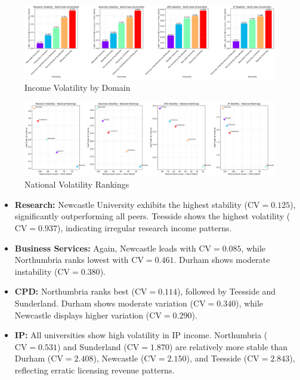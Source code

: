\documentclass[journal,onecolumn, 10pt,draftclsnofoot]{IEEEtran}
\begin{document}
\begin{figure}[h]
\centering
\includegraphics[width=0.99\textwidth]{Fig/figure41.ne_volatility_comparison.png}
\caption{Income Volatility by Domain}
\label{fig:ne-volatility-comparison}
\end{figure}

\begin{figure}[h]
\centering
\includegraphics[width=0.99\textwidth]{Fig/figure42.national_volatility_rankings.png}
\caption{National Volatility Rankings}
\label{fig:national-volatility-rankings}
\end{figure}

\begin{itemize}
    \item \textbf{Research:} Newcastle University exhibits the highest stability ($\mathrm{CV}=0.125$), significantly outperforming all peers. Teesside shows the highest volatility ($\mathrm{CV}=0.937$), indicating irregular research income patterns.
    
    \item \textbf{Business Services:} Again, Newcastle leads with $\mathrm{CV}=0.085$, while Northumbria ranks lowest with $\mathrm{CV}=0.461$. Durham shows moderate instability ($\mathrm{CV}=0.380$).
    
    \item \textbf{CPD:} Northumbria ranks best ($\mathrm{CV}=0.114$), followed by Teesside and Sunderland. Durham shows moderate variation ($\mathrm{CV}=0.340$), while Newcastle displays higher variation ($\mathrm{CV}=0.290$).
    
    \item \textbf{IP:} All universities show high volatility in IP income. Northumbria ($\mathrm{CV}=0.531$) and Sunderland ($\mathrm{CV}=1.870$) are relatively more stable than Durham ($\mathrm{CV}=2.408$), Newcastle ($\mathrm{CV}=2.150$), and Teesside ($\mathrm{CV}=2.843$), reflecting erratic licensing revenue patterns.
\end{itemize}
\end{document}
